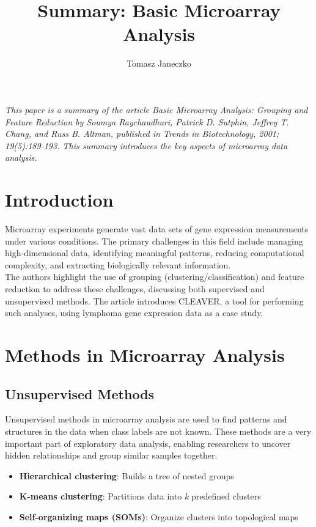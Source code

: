 \documentclass{llncs}
\begin{document}
\title{Summary: Basic Microarray Analysis}

\author{Tomasz Janeczko}

\maketitle 

\vspace{1cm} %

\textit{This paper is a summary of the article Basic Microarray Analysis: Grouping and Feature Reduction by Soumya Raychaudhuri, Patrick D. Sutphin, Jeffrey T. Chang, and Russ B. Altman, published in Trends in Biotechnology, 2001; 19(5):189-193. This summary introduces the key aspects of microarray data analysis.}

\section{Introduction}
Microarray experiments generate vast data sets of gene expression measurements under various conditions. The primary challenges in this field include managing high-dimensional data, identifying meaningful patterns, reducing computational complexity, and extracting biologically relevant information. \\
The authors highlight the use of grouping (clustering/classification) and feature reduction to address these challenges, discussing both supervised and unsupervised methods. The article introduces CLEAVER, a tool for performing such analyses, using lymphoma gene expression data as a case study.

\section{Methods in Microarray Analysis}

\subsection{Unsupervised Methods}
Unsupervised methods in microarray analysis are used to find patterns and structures in the data when class labels are not known. These methods are a very important part of exploratory data analysis, enabling researchers to uncover hidden relationships and group similar samples together.
\begin{itemize}
  \item \textbf{Hierarchical clustering}: Builds a tree of nested groups
  \item \textbf{K-means clustering}: Partitions data into \textit{k} predefined clusters
  \item \textbf{Self-organizing maps (SOMs)}: Organize clusters into topological maps
\end{itemize}
\end{document}
